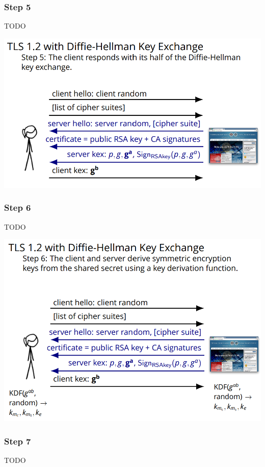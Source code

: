 \documentclass[11pt]{article} %
\begin{document}
{\newpage
\subsubsection{Step 5}
TODO

\includegraphics[scale=1.2]{./DiffieStep5.png}

\newpage
\subsubsection{Step 6}
TODO

\includegraphics[scale=1.2]{./DiffieStep6.png}

\newpage
\subsubsection{Step 7}
TODO

}
\end{document}
